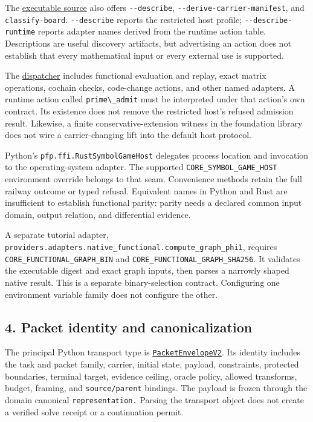 \documentclass[
  11pt,
]{article}
\newcommand{\passthrough}[1]{#1}
\begin{document}
The
\href{https://github.com/dbccpage/the_symbol_game/blob/52cb5457f6c485ba548cfd292f6012a941ed22cf/engine/crates_rs/core_symbol_game/src/main.rs}{executable
source} also offers \passthrough{\lstinline!--describe!},
\nolinkurl{--derive-carrier-manifest}, and \nolinkurl{classify-board}.
\passthrough{\lstinline!--describe!} reports the restricted host
profile; \nolinkurl{--describe-runtime} reports adapter names derived
from the runtime action table. Descriptions are useful discovery
artifacts, but advertising an action does not establish that every
mathematical input or every external use is supported.

The
\href{https://github.com/dbccpage/the_symbol_game/blob/52cb5457f6c485ba548cfd292f6012a941ed22cf/engine/crates_rs/core_symbol_game/src/invoke.rs}{dispatcher}
includes functional evaluation and replay, exact matrix operations,
cochain checks, code-change actions, and other named adapters. A runtime
action called \passthrough{\lstinline!prime\_admit!} must be interpreted
under that action's own contract. Its existence does not remove the
restricted host's refused admission result. Likewise, a finite
conservative-extension witness in the foundation library does not wire a
carrier-changing lift into the default host protocol.

Python's \nolinkurl{pfp.ffi.RustSymbolGameHost} delegates
process location and invocation to the operating-system adapter. The
supported \nolinkurl{CORE_SYMBOL_GAME_HOST} environment override
belongs to that seam. Convenience methods retain the full railway
outcome or typed refusal. Equivalent names in Python and Rust are
insufficient to establish functional parity: parity needs a declared
common input domain, output relation, and differential evidence.

A separate tutorial adapter,
\nolinkurl{providers.adapters.native_functional.compute_graph_phi1},
requires \nolinkurl{CORE_FUNCTIONAL_GRAPH_BIN} and
\nolinkurl{CORE_FUNCTIONAL_GRAPH_SHA256}. It validates the executable
digest and exact graph inputs, then parses a narrowly shaped native
result. This is a separate binary-selection contract. Configuring one
environment variable family does not configure the other.

\subsection{4. Packet identity and
canonicalization}\label{packet-identity-and-canonicalization}

The principal Python transport type is
\href{https://github.com/dbccpage/the_symbol_game/blob/52cb5457f6c485ba548cfd292f6012a941ed22cf/pfp/domain/entities/packet_envelope.py}{\nolinkurl{PacketEnvelopeV2}}.
Its identity includes the task and packet family, carrier, initial
state, payload, constraints, protected boundaries, terminal target,
evidence ceiling, oracle policy, allowed transforms, budget, framing,
and \nolinkurl{source/parent} bindings. The payload is frozen through
the domain canonical \nolinkurl{representation.} Parsing the transport
object does not create a verified solve receipt or a continuation
permit.
\end{document}

